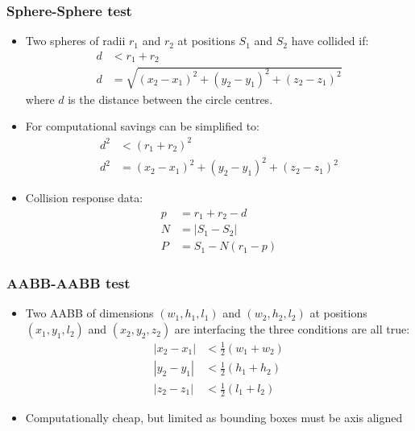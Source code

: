 \documentclass[a4paper]{article}
\begin{document}
\subsubsection{Sphere-Sphere test}

\begin{itemize}
  \item
    Two spheres of radii $r_{1}$ and $r_{2}$ at positions $S_{1}$ and $S_{2}$
    have collided if:
    \begin{align*}
      d &< r_{1} + r_{2} \\
      d &= \sqrt{(x_{2} - x_{1})^{2} + (y_{2} - y_{1})^{2} + (z_{2} - z_{1})^{2}}
    \end{align*}
    where $d$ is the distance between the circle centres.

  \item
    For computational savings can be simplified to:
    \begin{align*}
      d^{2} &< (r_{1} + r_{2})^{2} \\
      d^{2} &= (x_{2} - x_{1})^{2} + (y_{2} - y_{1})^{2} + (z_{2} - z_{1})^{2}
    \end{align*}

  \item
    Collision response data:
    \begin{align*}
      p &= r_{1} + r_{2} - d \\
      N &= |S_{1} - S_{2}| \\
      P &= S_{1} - N(r_{1} - p)
    \end{align*}

\end{itemize}

\subsubsection{AABB-AABB test}

\begin{itemize}
  \item
    Two AABB of dimensions $(w_{1}, h_{1}, l_{1})$ and $(w_{2}, h_{2}, l_{2})$
    at positions $(x_{1}, y_{1}, l_{2})$ and $(x_{2}, y_{2}, z_{2})$ are
    interfacing the three conditions are all true:
    \begin{align*}
      |x_{2} - x_{1}| &< \frac{1}{2}(w_{1} + w_{2}) \\
      |y_{2} - y_{1}| &< \frac{1}{2}(h_{1} + h_{2}) \\
      |z_{2} - z_{1}| &< \frac{1}{2}(l_{1} + l_{2})
    \end{align*}

  \item
    Computationally cheap, but limited as bounding boxes must be axis aligned

\end{itemize}
\end{document}
